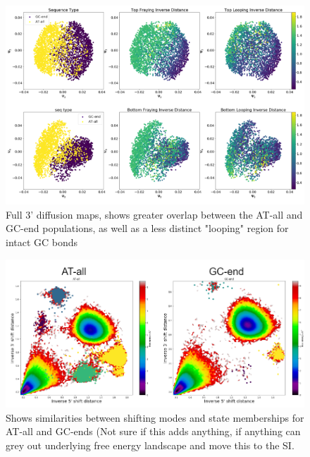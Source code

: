 \documentclass[journal=jpcbfk,manuscript=article]{achemso}
\begin{document}
\begin{figure}[ht!]
	\begin{center}
        \includegraphics[width=\textwidth]{Figs/figs_0804/GC-end_dmaps_3prime.PNG}
        \caption{Full 3' diffusion maps, shows greater overlap between the AT-all and GC-end populations, as well as a less distinct "looping" region for intact GC bonds}
        \label{fig:GC-end_dmaps_3prime}
	\end{center}
\end{figure}

\begin{figure}[ht!]
	\begin{center}
        \includegraphics[width=\textwidth]{Figs/skeleton/shifting_distribution.PNG}
        \caption{Shows similarities between shifting modes and state memberships for AT-all and GC-ends (Not sure if this adds anything, if anything can grey out underlying free energy landscape and move this to the SI.}
        \label{fig:shifting_distributions}
	\end{center}
\end{figure}
\end{document}
